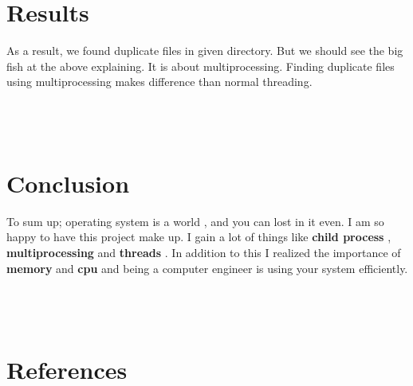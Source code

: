 \documentclass[onecolumn]{article}
\begin{document}
\section{Results}

As a result, we found duplicate files in given directory. But we should see the big fish at the above explaining. It is about multiprocessing. Finding duplicate files using multiprocessing makes difference than normal threading.\\\\\\\\


\section{Conclusion}

To sum up; operating system is a world , and you can lost in it even. I am so happy to have this project make up. I gain a lot of things like\textbf{ child process },\textbf{ multiprocessing} and\textbf{ threads} . In addition to this I realized the importance of \textbf{memory} and \textbf{cpu} and being a computer engineer is using your system efficiently.\\\\\\\\

\section{References}
\end{document}
